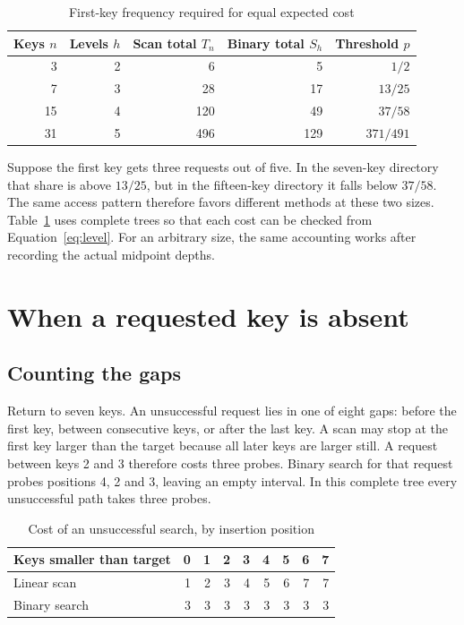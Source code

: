 \documentclass[lang=en]{fduthesis}
\begin{document}
\begin{table}[htbp]
  \centering
  \caption{First-key frequency required for equal expected cost}
  \label{tab:sizes}
  \begin{tabular}{rrrrr}
    \toprule
    Keys $n$ & Levels $h$ & Scan total $T_n$ & Binary total $S_h$ & Threshold $p$ \\
    \midrule
    3  & 2 &   6 &   5 & $1/2$ \\
    7  & 3 &  28 &  17 & $13/25$ \\
    15 & 4 & 120 &  49 & $37/58$ \\
    31 & 5 & 496 & 129 & $371/491$ \\
    \bottomrule
  \end{tabular}
\end{table}

Suppose the first key gets three requests out of five. In the seven-key
directory that share is above $13/25$, but in the fifteen-key directory it
falls below $37/58$. The same access pattern therefore favors different
methods at these two sizes. Table~\ref{tab:sizes} uses complete trees so
that each cost can be checked from Equation~\ref{eq:level}. For an arbitrary
size, the same accounting works after recording the actual midpoint depths.

\chapter{When a requested key is absent}
\section{Counting the gaps}
Return to seven keys. An unsuccessful request lies in one of eight gaps:
before the first key, between consecutive keys, or after the last key.
A scan may stop at the first key larger than the target because all later
keys are larger still. A request between keys 2 and 3 therefore costs three
probes. Binary search for that request probes positions 4, 2 and 3, leaving
an empty interval. In this complete tree every unsuccessful path takes three
probes.

\begin{table}[htbp]
  \centering
  \caption{Cost of an unsuccessful search, by insertion position}
  \label{tab:gaps}
  \begin{tabular}{lrrrrrrrr}
    \toprule
    Keys smaller than target & 0 & 1 & 2 & 3 & 4 & 5 & 6 & 7 \\
    \midrule
    Linear scan   & 1 & 2 & 3 & 4 & 5 & 6 & 7 & 7 \\
    Binary search & 3 & 3 & 3 & 3 & 3 & 3 & 3 & 3 \\
    \bottomrule
  \end{tabular}
\end{table}
\end{document}
